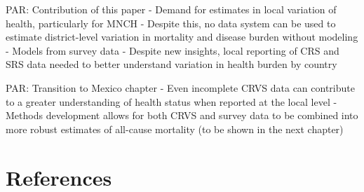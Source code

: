 \documentclass[
]{article}
\begin{document}
PAR: Contribution of this paper
- Demand for estimates in local variation of health, particularly for MNCH
- Despite this, no data system can be used to estimate district-level variation in mortality
and disease burden without modeling
- Models from survey data
- Despite new insights, local reporting of CRS and SRS data needed to better understand
variation in health burden by country

PAR: Transition to Mexico chapter
- Even incomplete CRVS data can contribute to a greater understanding of health status
when reported at the local level
- Methods development allows for both CRVS and survey data to be combined into more
robust estimates of all-cause mortality (to be shown in the next chapter)

\hypertarget{references}{%
\section{References}\label{references}}
\end{document}

